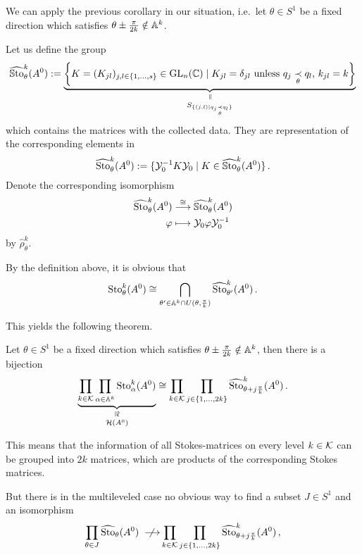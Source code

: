 We can apply the previous corollary in our situation, i.e.\ let $\theta\in S^1$
be a fixed direction which satisfies $\theta\pm\frac{\pi}{2k}\notin\mathbb{A}^k$.
\begin{defn}
  Let us define the group
  \[
    \hat\SSto_{\theta}^k(A^0):=
    \underset{S_{\{(j,l) \mid q_j \underset{\theta}{\prec} q_l \}}}{
      \underset{\text{\rotatebox[origin=c]{-90}{$=$}}}{
        \underbrace{
          \left\{K=(K_{jl})_{j,l\in\{1,\dots,s\}}\in\GL_n(\C)\mid
            K_{jl}=\delta_{jl} \text{~unless~}
            q_j \underset{\theta}{\prec} q_l \text{, } k_{jl}=k\right\}}}}
  \]
  which contains the matrices with the collected data. They are representation
  of the corresponding elements in
  \[
    \widehat{\operatorname{Sto}}_{\theta}^k(A^0):=
    \{\mathcal{Y}_0^{-1}K\mathcal{Y}_0\mid K\in\widehat{\operatorname{\mathbb{S}to}}_{\theta}^k(A^0) \} \,.
  \]
  Denote the corresponding isomorphism
  \begin{align*}
    \widehat{\operatorname{Sto}}_\theta^k(A^0) &\overset{\cong}{\longrightarrow}
                             \widehat{\operatorname{\mathbb{S}to}}_\theta^k(A^0)
    \\
    \varphi &\longmapsto \mathcal{Y}_0\varphi\mathcal{Y}_0^{-1}
  \end{align*}
  by $\hat\rho_\theta^k$.
  \begin{s-rem}
    By the definition above, it is obvious that
    \[
      \operatorname{Sto}_{\theta}^k(A^0)\cong
      \bigcap_{\theta'\in \mathbb{A}^k\cap U(\theta,\frac{\pi}{k})}
      \widehat{\operatorname{Sto}}_{\theta'}^k(A^0) \,.
    \]
  \end{s-rem}
\end{defn}
This yields the following theorem.
\begin{thm}\label{thm:theoremForlargerDecomp}
  Let $\theta\in S^1$ be a fixed direction which satisfies
  $\theta\pm\frac{\pi}{2k}\notin\mathbb{A}^k$, then there is a bijection
  \[
    \underset{\cH(A^0)}{%
      \underset{\text{\rotatebox[origin=c]{-90}{$\cong$}}}{\underbrace{%
        \prod_{k\in\cK}\prod_{\alpha\in\A^k}\Sto_\alpha^k(A^0)}}}
    \cong
    \prod_{k\in\cK}\prod_{j\in\{1,\dots,2k\}}
    \hat\Sto_{\theta+j\frac{\pi}{k}}^k(A^0) \,.
  \]
  \begin{s-rem}
    This means that the information of all Stokes-matrices on every level
    $k\in\mathcal{K}$ can be grouped into $2k$ matrices, which are products of the
    corresponding Stokes matrices.
  \end{s-rem}
\end{thm}
But there is in the multileveled case no obvious way to find a subset $J\in S^1$
and an isomorphism
\[
  \prod_{\theta\in J} \widehat{\operatorname{Sto}}_{\theta}(A^0)
  ~~\not{\!\!\!\!\longrightarrow}
  \prod_{k\in\mathcal{K}}\prod_{j\in\{1,\dots,2k\}}
  \widehat{\operatorname{Sto}}_{\theta+j\frac{\pi}{k}}^k(A^0)\,,
\]
